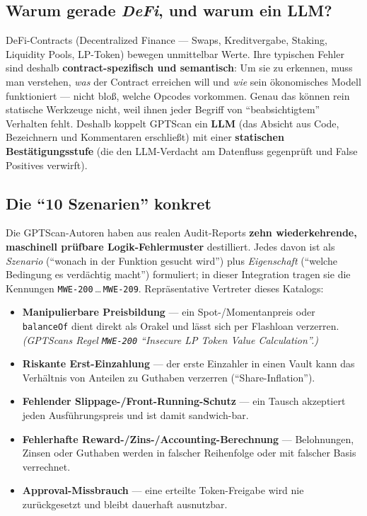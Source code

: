 \documentclass[11pt,a4paper]{scrartcl}
\newcommand{\code}[1]{\texttt{#1}}
\begin{document}
\subsection*{Warum gerade \emph{DeFi}, und warum ein LLM?}

DeFi-Contracts (Decentralized Finance --- Swaps, Kreditvergabe, Staking, Liquidity
Pools, LP-Token) bewegen unmittelbar Werte. Ihre typischen Fehler sind deshalb
\textbf{contract-spezifisch und semantisch}: Um sie zu erkennen, muss man verstehen,
\emph{was} der Contract erreichen will und \emph{wie} sein ökonomisches Modell
funktioniert --- nicht bloß, welche Opcodes vorkommen. Genau das können rein statische
Werkzeuge nicht, weil ihnen jeder Begriff von \enquote{beabsichtigtem} Verhalten fehlt.
Deshalb koppelt GPTScan ein \textbf{LLM} (das Absicht aus Code, Bezeichnern und
Kommentaren erschließt) mit einer \textbf{statischen Bestätigungsstufe} (die den
LLM-Verdacht am Datenfluss gegenprüft und False Positives verwirft).

\subsection*{Die \enquote{10 Szenarien} konkret}

Die GPTScan-Autoren haben aus realen Audit-Reports \textbf{zehn wiederkehrende,
maschinell prüfbare Logik-Fehlermuster} destilliert. Jedes davon ist als
\emph{Szenario} (\enquote{wonach in der Funktion gesucht wird}) plus \emph{Eigenschaft}
(\enquote{welche Bedingung es verdächtig macht}) formuliert; in dieser Integration
tragen sie die Kennungen \code{MWE-200}\,\dots\,\code{MWE-209}. Repräsentative Vertreter
dieses Katalogs:

\begin{itemize}[leftmargin=1.4em]
  \item \textbf{Manipulierbare Preisbildung} --- ein Spot-/Momentanpreis oder
    \code{balanceOf} dient direkt als Orakel und lässt sich per Flashloan verzerren.
    \emph{(GPTScans Regel \code{MWE-200} \enquote{Insecure LP Token Value Calculation}.)}
  \item \textbf{Riskante Erst-Einzahlung} --- der erste Einzahler in einen Vault kann
    das Verhältnis von Anteilen zu Guthaben verzerren (\enquote{Share-Inflation}).
  \item \textbf{Fehlender Slippage-/Front-Running-Schutz} --- ein Tausch akzeptiert
    jeden Ausführungspreis und ist damit sandwich-bar.
  \item \textbf{Fehlerhafte Reward-/Zins-/Accounting-Berechnung} --- Belohnungen,
    Zinsen oder Guthaben werden in falscher Reihenfolge oder mit falscher Basis verrechnet.
  \item \textbf{Approval-Missbrauch} --- eine erteilte Token-Freigabe wird nie
    zurückgesetzt und bleibt dauerhaft ausnutzbar.
\end{itemize}
\end{document}
